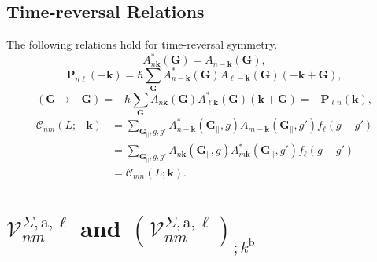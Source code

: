 \subsection{Time-reversal Relations}
The following relations hold for time-reversal symmetry.
\begin{equation*}
A_{n\mathbf{k}}^{*}(\mathbf{G}) = A_{n-\mathbf{k}}(\mathbf{G}),
\end{equation*}
\begin{equation*}
\mathbf{P}_{n\ell }(-\mathbf{k}) 
=   \hbar\sum_{\mathbf{G}}
    A_{n-\mathbf{k}}^{*}(\mathbf{G})
    A_{\ell -\mathbf{k}}(\mathbf{G})(-\mathbf{k}+\mathbf{G}),
\end{equation*}
\begin{equation*}
(\mathbf{G}\rightarrow-\mathbf{G})
=   -\hbar\sum_{\mathbf{G}}
    A_{n\mathbf{k}}(\mathbf{G})
    A_{\ell\mathbf{k}}^{*}(\mathbf{G})(\mathbf{k}+\mathbf{G})
=   -\mathbf{P}_{\ell n}(\mathbf{k}),
\end{equation*}
\begin{align*}
\mathcal{C}_{nm} (L;-\mathbf{k}) 
&=  \sum_{\mathbf{G}_{\parallel},g,g'}
    A_{n-\mathbf{k}}^{*}(\mathbf{G}_{\parallel},g)
    A_{m-\mathbf{k}}(\mathbf{G}_{\parallel},g')
    f_{\ell}(g-g') \\
&=  \sum_{\mathbf{G}_{\parallel},g,g'}
    A_{n\mathbf{k}} (\mathbf{G}_{\parallel},g)
    A_{m\mathbf{k}}^{*} (\mathbf{G}_{\parallel},g')
    f_{\ell}(g-g') \\
&=  \mathcal{C}_{mn}(L;\mathbf{k}).
\end{align*}



\section[The Layered Velocity Operator and its Generalized Derivative.]
{\texorpdfstring{$\mathcal{V}^{\Sigma,\mathrm{a},\ell}_{nm}$}{Vnm} and 
\texorpdfstring{
$\left(\mathcal{V}^{\Sigma,\mathrm{a},\ell}_{nm}\right)_{;k^\mathrm{b}}$}
{(Vnm);kb}}
\label{app:calvs}

